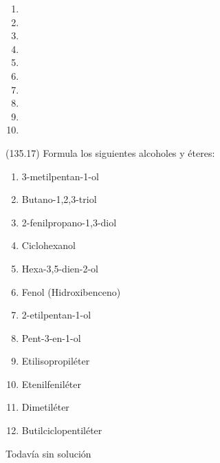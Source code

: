   \begin{solution}
    \begin{enumerate}
      \item {}
      \item {}
      \item {}
      \item {}
      \item {}
      \item {}
      \item {}
      \item {}
      \item {}
      \item {}
    \end{enumerate}
  \end{solution}




  \begin{exercise}[
      tags    = {},
      topics  = {química, química orgánica, orgánica},
      source  = {FQ 1B MGH 2016, p135, e17},
    ]
    (135.17) Formula los siguientes alcoholes y éteres:
    \begin{enumerate}
      \item 3-metilpentan-1-ol
      \item Butano-1,2,3-triol
      \item 2-fenilpropano-1,3-diol
      \item Ciclohexanol
      \item Hexa-3,5-dien-2-ol
      \item Fenol (Hidroxibenceno)
      \item 2-etilpentan-1-ol
      \item Pent-3-en-1-ol
      \item Etilisopropiléter
      \item Etenilfeniléter
      \item Dimetiléter
      \item Butilciclopentiléter
    \end{enumerate}
  \end{exercise}

  \begin{solution}[print=false]
    Todavía sin solución
  \end{solution}




